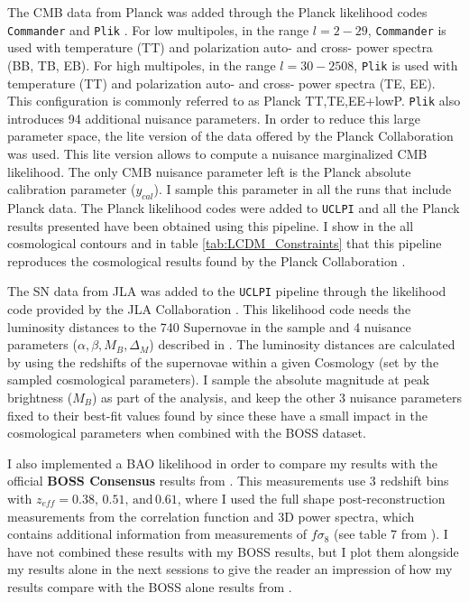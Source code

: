 \qquad The CMB data from Planck was added through the Planck likelihood codes \texttt{Commander} and \texttt{Plik} \citep{PlanckLikelihood2015}. For low multipoles, in the range $l=2-29$, \texttt{Commander} is used with temperature (TT) and polarization auto- and cross- power spectra (BB, TB, EB). For high multipoles, in the range $l=30-2508$, \texttt{Plik} is used with temperature (TT) and polarization auto- and cross- power spectra (TE, EE). This configuration is commonly referred to as Planck TT,TE,EE+lowP. \texttt{Plik} also introduces 94 additional nuisance parameters. In order to reduce this large parameter space, the lite version of the data offered by the Planck Collaboration was used. This lite version allows to compute a nuisance marginalized CMB likelihood. The only CMB nuisance parameter left is the Planck absolute calibration parameter ($y_{cal}$). I sample this parameter in all the runs that include Planck data. The Planck likelihood codes were added to \texttt{UCLPI} and all the Planck results presented have been obtained using this pipeline. I show in the all cosmological contours and in table \ref{tab:LCDM_Constraints} that this pipeline reproduces the cosmological results found by the Planck Collaboration \citep{PlanckCosmology2016}.

\qquad The SN data from JLA was added to the \texttt{UCLPI} pipeline through the likelihood code provided by the JLA Collaboration \citep{JLAdata}. This likelihood code needs the luminosity distances to the 740 Supernovae in the sample and 4 nuisance parameters ($\alpha, \beta, M_B, \Delta_M$) described in \cite{JLAdata}. The luminosity distances are calculated by \class \citep{Class} using the redshifts of the supernovae within a given Cosmology (set by the sampled cosmological parameters). I sample the absolute magnitude at peak brightness ($M_B$) as part of the analysis, and keep the other 3 nuisance parameters fixed to their best-fit values found by \cite{JLAdata} since these have a small impact in the cosmological parameters when combined with the BOSS dataset.

\qquad I also implemented a BAO likelihood in order to compare my results with the official \textbf{BOSS Consensus} results from \cite{2016BOSSCosmology}. This measurements use 3 redshift bins with $z_{eff} = 0.38, \, 0.51, \, \text{and} \, 0.61 $, where I used the full shape post-reconstruction measurements from the correlation function and 3D power spectra, which contains additional information from measurements of $f\sigma_8$ (see table 7 from \cite{2016BOSSCosmology}). I have not combined these results with my BOSS results, but I plot them alongside my results alone in the next sessions to give the reader an impression of how my results compare with the BOSS alone results from \cite{2016BOSSCosmology}.


